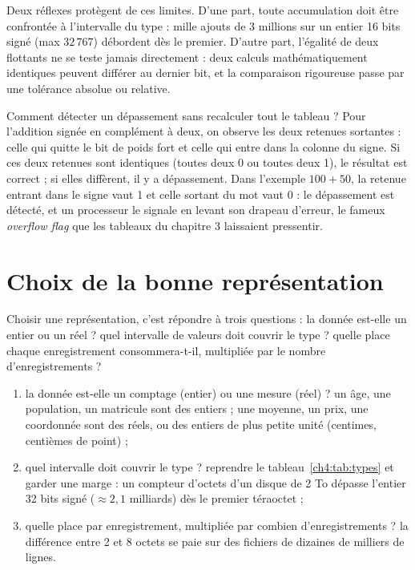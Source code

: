 \begin{attention}
Deux réflexes protègent de ces limites. D'une part, toute accumulation doit être confrontée à l'intervalle du type : mille ajouts de 3 millions sur un entier 16 bits signé (max $32\,767$) débordent dès le premier. D'autre part, l'égalité de deux flottants ne se teste jamais directement : deux calculs mathématiquement identiques peuvent différer au dernier bit, et la comparaison rigoureuse passe par une tolérance absolue ou relative.
\end{attention}

\begin{remarque}
Comment détecter un dépassement sans recalculer tout le tableau ? Pour l'addition signée en complément à deux, on observe les deux retenues sortantes : celle qui quitte le bit de poids fort et celle qui entre dans la colonne du signe. Si ces deux retenues sont identiques (toutes deux 0 ou toutes deux 1), le résultat est correct ; si elles diffèrent, il y a dépassement. Dans l'exemple $100 + 50$, la retenue entrant dans le signe vaut 1 et celle sortant du mot vaut 0 : le dépassement est détecté, et un processeur le signale en levant son drapeau d'erreur, le fameux \emph{overflow flag} que les tableaux du chapitre 3 laissaient pressentir.
\end{remarque}

\section{Choix de la bonne représentation}

Choisir une représentation, c'est répondre à trois questions : la donnée est-elle un entier ou un réel ? quel intervalle de valeurs doit couvrir le type ? quelle place chaque enregistrement consommera-t-il, multipliée par le nombre d'enregistrements ?

\begin{methode}
\begin{enumerate}
  \item la donnée est-elle un comptage (entier) ou une mesure (réel) ? un âge, une population, un matricule sont des entiers ; une moyenne, un prix, une coordonnée sont des réels, ou des entiers de plus petite unité (centimes, centièmes de point) ;
  \item quel intervalle doit couvrir le type ? reprendre le tableau~\ref{ch4:tab:types} et garder une marge : un compteur d'octets d'un disque de 2 To dépasse l'entier 32 bits signé ($\approx 2{,}1$ milliards) dès le premier téraoctet ;
  \item quelle place par enregistrement, multipliée par combien d'enregistrements ? la différence entre 2 et 8 octets se paie sur des fichiers de dizaines de milliers de lignes.
\end{enumerate}
\end{methode}

